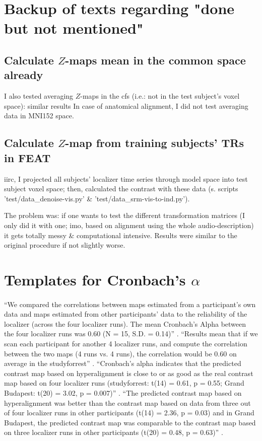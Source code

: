 \section{Backup of texts regarding "done but not mentioned"}

\subsection{Calculate $Z$-maps mean in the common space already}
%
I also tested averaging $Z$-maps in the \ac{cfs} (i.e.: not in the test
subject's voxel space): similar results
%
In case of anatomical alignment, I did
not test averaging data in MNI152 space.

\subsection{Calculate $Z$-map from training subjects' TRs in FEAT}

iirc, I projected all subjects' localizer time series through
model space into test subject voxel space; then, calculated the contrast
with these data (s. scripts 'test/data\_denoise-vis.py' \&
'test/data\_srm-vis-to-ind.py').
%

The problem was: if one wants to test the different transformation matrices (I
only did it with one; imo, based on alignment using the whole audio-description)
it gets totally messy \& computational intensive.
%
Results were similar to the original procedure if not slightly worse.



\pagebreak

\section{Templates for Cronbach's $\alpha$}


\paragraph{\citet{jiahui2020predicting}}
%
``We compared the correlations between maps estimated from a participant's own
data and maps estimated from other participants' data to the reliability of the
localizer (across the four localizer runs).
%
The mean Cronbach's Alpha between the four localizer runs was 0.60 (N = 15, S.D.
= 0.14)'' \citep{jiahui2020predicting}.
%
``Results mean that if we scan each participant for another 4 localizer
runs, and compute the correlation between the two maps (4 runs vs. 4 runs), the
correlation would be 0.60 on average in the studyforrest''
\citep{jiahui2020predicting}.
%
``Cronbach's alpha indicates that the predicted contrast map based on
hyperalignment is close to or as good as the real contrast map based on four
localizer runs (studyforrest: t(14) = 0.61, p = 0.55; Grand Budapest: t(20) =
3.02, p = 0.007)'' \citep{jiahui2020predicting}.
%
``The predicted contrast map based on hyperalignment was better than the
contrast map based on data from three out of four localizer runs in other
participants (t(14) = 2.36, p = 0.03) and in Grand Budapest, the predicted
contrast map was comparable to the contrast map based on three localizer runs in
other participants (t(20) = 0.48, p = 0.63)''
\citep{jiahui2020predicting}.


